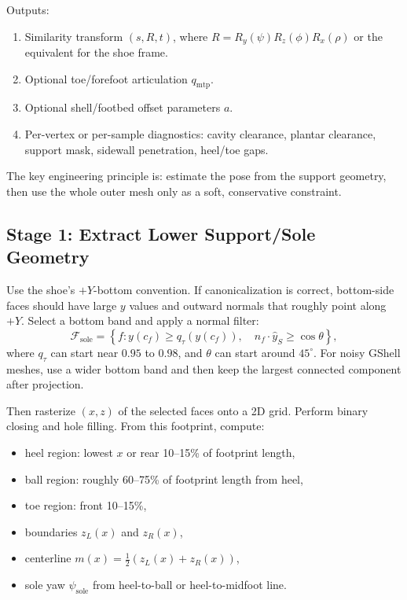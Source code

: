 \documentclass[11pt]{article}
\begin{document}
Outputs:

\begin{enumerate}
  \item Similarity transform $(s,R,t)$, where $R=R_y(\psi)R_z(\phi)R_x(\rho)$ or the equivalent for the shoe frame.
  \item Optional toe/forefoot articulation $q_{\mathrm{mtp}}$.
  \item Optional shell/footbed offset parameters $a$.
  \item Per-vertex or per-sample diagnostics: cavity clearance, plantar clearance, support mask, sidewall penetration, heel/toe gaps.
\end{enumerate}

The key engineering principle is: estimate the pose from the support geometry, then use the whole outer mesh only as a soft, conservative constraint.

\subsection{Stage 1: Extract Lower Support/Sole Geometry}

Use the shoe's $+Y$-bottom convention. If canonicalization is correct, bottom-side faces should have large $y$ values and outward normals that roughly point along $+Y$. Select a bottom band and apply a normal filter:
\begin{equation}
\mathcal{F}_{\mathrm{sole}} =
\left\{
f :
y(c_f)\ge q_{\tau}(y(c_f)),
\quad
n_f\cdot \hat{y}_S\ge \cos \theta
\right\},
\end{equation}
where $q_{\tau}$ can start near $0.95$ to $0.98$, and $\theta$ can start around $45^\circ$. For noisy GShell meshes, use a wider bottom band and then keep the largest connected component after projection.

Then rasterize $(x,z)$ of the selected faces onto a 2D grid. Perform binary closing and hole filling. From this footprint, compute:

\begin{itemize}
  \item heel region: lowest $x$ or rear 10--15\% of footprint length,
  \item ball region: roughly 60--75\% of footprint length from heel,
  \item toe region: front 10--15\%,
  \item boundaries $z_L(x)$ and $z_R(x)$,
  \item centerline $m(x)=\frac{1}{2}(z_L(x)+z_R(x))$,
  \item sole yaw $\psi_{\mathrm{sole}}$ from heel-to-ball or heel-to-midfoot line.
\end{itemize}
\end{document}

